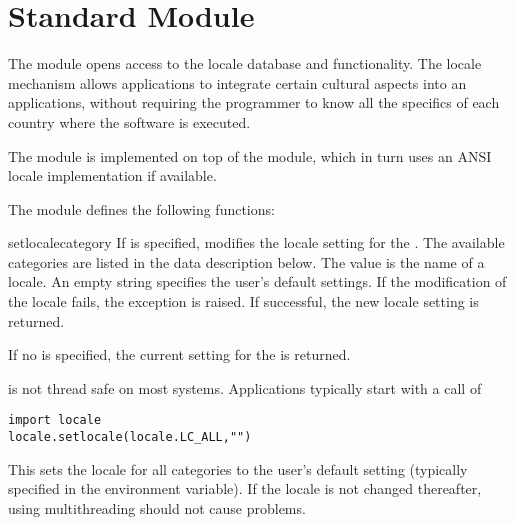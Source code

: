 \section{Standard Module }

\label{module-locale}

The  module opens access to the \POSIX{} locale database
and functionality. The \POSIX{} locale mechanism allows applications
to integrate certain cultural aspects into an applications, without
requiring the programmer to know all the specifics of each country
where the software is executed.

The  module is implemented on top of the 
module, which in turn uses an ANSI \C{} locale implementation if
available.

The  module defines the following functions:

\renewcommand{\indexsubitem}{(in module locale)}

\begin{funcdesc}{setlocale}{category}
If  is specified, modifies the locale setting for the
. The available categories are listed in the data
description below. The value is the name of a locale. An empty string
specifies the user's default settings. If the modification of the
locale fails, the exception  is
raised. If successful, the new locale setting is returned.

If no  is specified, the current setting for the
 is returned.

 is not thread safe on most systems. Applications
typically start with a call of
\bcode\begin{verbatim}
import locale
locale.setlocale(locale.LC_ALL,"")
\end{verbatim}\ecode
This sets the locale for all categories to the user's default setting
(typically specified in the  environment variable). If the
locale is not changed thereafter, using multithreading should not
cause problems.
\end{funcdesc}

